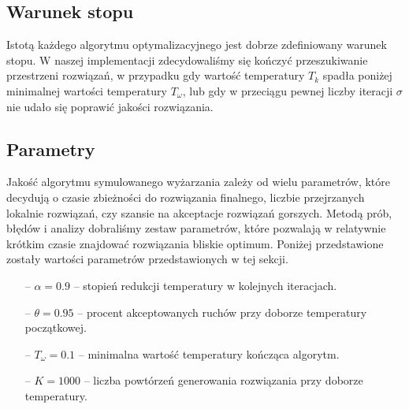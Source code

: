 \subsection{Warunek stopu}
Istotą każdego algorytmu optymalizacyjnego jest dobrze zdefiniowany warunek stopu. W naszej implementacji zdecydowaliśmy się kończyć przeszukiwanie przestrzeni rozwiązań, w przypadku gdy wartość temperatury $T_k$ spadła poniżej minimalnej wartości temperatury $T_\omega$, lub gdy w przeciągu pewnej liczby iteracji $\sigma$ nie udało się poprawić jakości rozwiązania. 


\subsection{Parametry}
Jakość algorytmu symulowanego wyżarzania zależy od wielu parametrów, które decydują o czasie zbieżności do rozwiązania finalnego, liczbie przejrzanych lokalnie rozwiązań, czy szansie na akceptacje rozwiązań gorszych. Metodą prób, błędów i analizy dobraliśmy zestaw parametrów, które pozwalają w relatywnie krótkim czasie znajdować rozwiązania bliskie optimum. Poniżej przedstawione zostały wartości parametrów przedstawionych w tej sekcji.

\begin{itemize}
	\item[--] $\alpha = 0.9$ -- stopień redukcji temperatury w kolejnych iteracjach.
	\item[--] $\theta = 0.95$ -- procent akceptowanych ruchów przy doborze temperatury początkowej.
	\item[--] $T_\omega = 0.1$ -- minimalna wartość temperatury kończąca algorytm.
	\item[--] $K = 1000$ -- liczba powtórzeń generowania rozwiązania przy doborze temperatury.
\end{itemize}




